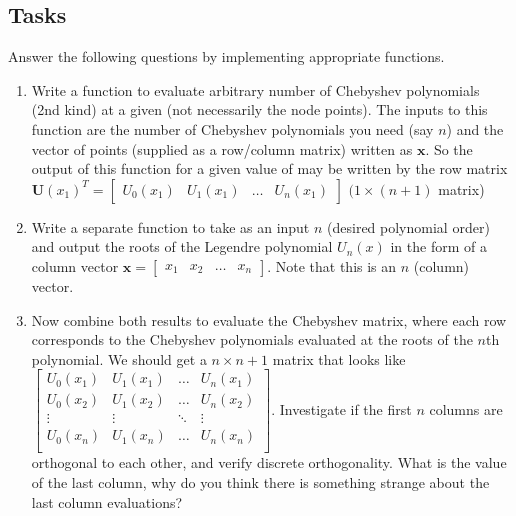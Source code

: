 \documentclass{article}
\begin{document}
\subsection{Tasks}
Answer the following questions by implementing appropriate functions.
\begin{enumerate}
    \item Write a function to evaluate arbitrary number of Chebyshev polynomials (2nd kind) at a given (not necessarily the node 
    points). The inputs to this function are the number of Chebyshev polynomials you need (say $n$) and the vector of points (supplied as a row/column matrix) written as $\mathbf{x}$. So the output of this function for a given value of may be written by the row matrix $\mathbf{U}({x_1})^T= \begin{bmatrix}
        U_0(x_1) & U_1(x_1) & \dots & U_n(x_1)
    \end{bmatrix}$ $(1 \times (n+1)$ matrix)

    \item Write a separate function to take as an input $n$ (desired polynomial order) and output the roots of the Legendre polynomial $U_n(x)$ in the form of a column vector $\mathbf{x}=\begin{bmatrix}
        x_1 & x_2 & \dots & x_n
    \end{bmatrix}$. Note that this is an $n$ (column) vector.

    \item Now combine both results to evaluate the Chebyshev matrix, where each row corresponds to the Chebyshev polynomials evaluated at the roots of the $n$th polynomial. We should get a $n \times n+1$ matrix that looks like
    $
    \begin{bmatrix}
        U_0(x_1) & U_1(x_1) & \dots & U_n(x_1) \\
        U_0(x_2) & U_1(x_2) & \dots & U_n(x_2) \\
        \vdots & \vdots & \ddots & \vdots \\
        U_0(x_n) & U_1(x_n) & \dots & U_n(x_n) \\
    \end{bmatrix}.  
    $
    Investigate if the first $n$ columns are orthogonal to each other, and verify discrete orthogonality. What is the value of the last column, why do you think there is something strange about the last column evaluations?


\end{enumerate}
\end{document}
